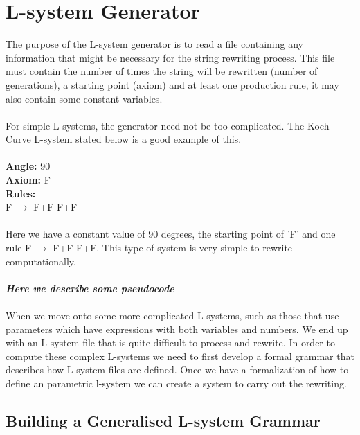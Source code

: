 \section{L-system Generator}

The purpose of the L-system generator is to read a file containing any information that might be necessary for the string rewriting process. This file must contain the number of times the string will be rewritten (number of generations), a starting point (axiom) and at least one production rule, it may also contain some constant variables. \\
\\
For simple L-systems, the generator need not be too complicated. The Koch Curve L-system stated below is a good example of this. \\
\\
\textbf{Angle:} 90\\
\textbf{Axiom:} F\\
\textbf{Rules:} \\
F $\rightarrow$ F+F-F+F\\
\\
Here we have a constant value of 90 degrees, the starting point of 'F' and one rule F $\rightarrow$ F+F-F+F. This type of system is very simple to rewrite computationally. \\ 
\\
\textbf{\textit{Here we describe some pseudocode}}\\
\\
When we move onto some more complicated L-systems, such as those that use parameters which have expressions with both variables and numbers. We end up with an L-system file that is quite difficult to process and rewrite. In order to compute these complex L-systems we need to first develop a formal grammar that describes how L-system files are defined. Once we have a formalization of how to define an parametric l-system we can create a system to carry out the rewriting.

\subsection{Building a Generalised L-system Grammar}

